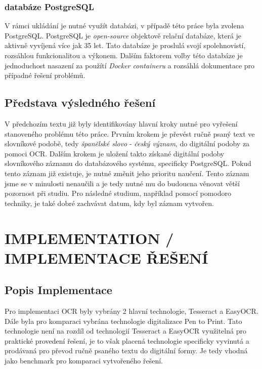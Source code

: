 \documentclass[journal]{IEEEtran}
\begin{document}
\subsubsection{databáze PostgreSQL}
V rámci ukládání je nutné využít databázi, v případě této práce byla zvolena PostgreSQL.
PostgreSQL je \textit{open-source} objektově relační databáze, která je aktivně vyvíjená více jak 35 let.
Tato databáze je proslulá svojí spolehnovistí, rozsáhlou funkcionalitou a výkonem.
Dalším faktorem volby této databáze je jednoduchost nasazení za použítí \textit{Docker containeru} a rozsáhlá dokumentace pro případné řešení problémů.\cite{postgre}

\subsection{Představa výsledného řešení}
V předchozím textu již byly identifikovány hlavní kroky nutné pro vyřešení stanoveného problému této práce.
Prvním krokem je převést ručně psaný text ve slovníkové podobě, tedy \textit{španělské slovo} - \textit{český význam}, do digitální podoby za pomoci \ac{OCR}.
Dalším krokem je uložení takto získané digitální podoby slovníkového záznamu do databázového systému, specificky PostgreSQL.\cite{postgre}
Pokud tento záznam již existuje, je nutné změnit jeho prioritu naučení.
Tento záznam jsme se v minulosti nenaučili a je tedy nutné mu do budoucna věnovat větší pozornost při studiu.
Pro následné studium, například pomocí pomodoro techniky, je také dobré zachvávat datum, kdy byl záznam vytvořen.


\section{IMPLEMENTATION / IMPLEMENTACE ŘEŠENÍ}

\subsection{Popis Implementace}
Pro implementaci \ac{OCR} byly vybrány 2 hlavní technologie, Tesseract\cite{tesseract} a EasyOCR\cite{easy_ocr}.
Dále byla pro komparaci vybrána technologie digitalizace Pen to Print\cite{pen_to_print}.
Tato technologie není na rozdíl od technologií Tesseract a EasyOCR využitelná pro praktické provedení řešení, je to však placená technologie specificky vyvinutá a prodávaná pro převod ručně psaného textu do digitální formy. Je tedy vhodná jako benchmark pro komparaci vytvořeného řešení.
\end{document}
